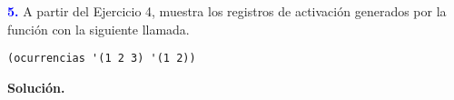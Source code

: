 \textbf{\textcolor{blue}{5.}} \Large
A partir del Ejercicio 4, muestra los registros de activación generados por la función con
la siguiente llamada.
\begin{lstlisting}
(ocurrencias '(1 2 3) '(1 2))
\end{lstlisting}

\textbf{Solución.} 
